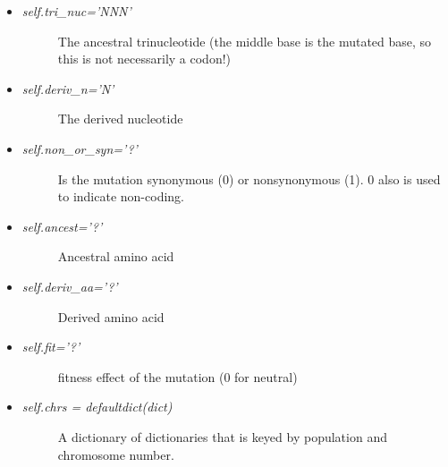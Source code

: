 \documentclass[letterpaper,10pt,english]{sphinxmanual}
\begin{document}
\begin{fulllineitems}
\begin{itemize}
\begin{itemize}
\begin{description}
\end{description}

\item {} \begin{description}
\item[{\emph{self.tri\_nuc='NNN'}}] \leavevmode
The ancestral trinucleotide (the middle base is the 
mutated base, so this is not necessarily a codon!)

\end{description}

\item {} \begin{description}
\item[{\emph{self.deriv\_n='N'}}] \leavevmode
The derived nucleotide

\end{description}

\item {} \begin{description}
\item[{\emph{self.non\_or\_syn='?'}}] \leavevmode
Is the mutation synonymous (0) or nonsynonymous (1).
0 also is used to indicate non-coding.

\end{description}

\item {} \begin{description}
\item[{\emph{self.ancest='?'}}] \leavevmode
Ancestral amino acid

\end{description}

\item {} \begin{description}
\item[{\emph{self.deriv\_aa='?'}}] \leavevmode
Derived amino acid

\end{description}

\item {} \begin{description}
\item[{\emph{self.fit='?'}}] \leavevmode
fitness effect of the mutation (0 for neutral)

\end{description}

\item {} \begin{description}
\item[{\emph{self.chrs = defaultdict(dict)}}] \leavevmode
A dictionary of dictionaries that is keyed by population
and chromosome number.


\end{description}
\end{itemize}
\end{itemize}
\end{fulllineitems}
\end{document}
